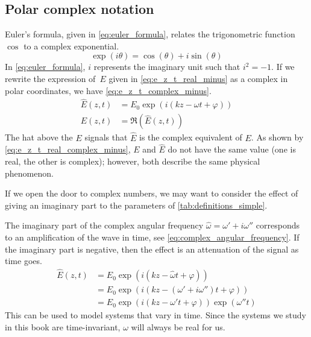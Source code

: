 \subsection{Polar complex notation}
\label{sec:polar_complex_notation}
Euler's formula, given in \cref{eq:euler_formula}, relates the trigonometric function $\cos$ to a complex exponential.
\begin{equation}    
    \exp(i\theta) = \cos(\theta) + i\sin(\theta) \label{eq:euler_formula}
\end{equation}
In \cref{eq:euler_formula}, $i$ represents the imaginary unit such that $i^2=-1$.
If we rewrite the expression of~$E$ given in \cref{eq:e_z_t_real_minus} as a complex in polar coordinates, we have \cref{eq:e_z_t_complex_minus}.
\begin{align}
   \hat{E}(z, t) &= E_0 \exp(i(kz - \omega t + \varphi))
   \label{eq:e_z_t_complex_minus}
   \\
   E(z, t) &= \Re(\hat{E}(z, t))
   \label{eq:e_z_t_real_complex_minus}
\end{align}
The hat above the $E$ signals that $\hat{E}$ is the complex equivalent of $E$.
As shown by \cref{eq:e_z_t_real_complex_minus}, $E$ and $\hat{E}$ do not have the same value (one is real, the other is complex);
however, both describe the same physical phenomenon.

If we open the door to complex numbers, we may want to consider the effect of giving an imaginary part to the parameters of \cref{tab:definitions_simple}.

The imaginary part of the complex angular frequency $\hat{\omega} = \omega' + i \omega''$ corresponds to an amplification of the wave in time, see \cref{eq:complex_angular_frequency}.
If the imaginary part is negative, then the effect is an attenuation of the signal as time goes.
\begin{subequations}
    \begin{align}
       \hat{E}(z, t) &=
       E_0 \exp(i(kz - \hat{\omega} t + \varphi))
       \\
       &=
       E_0 \exp(i(kz - (\omega' + i \omega'') t + \varphi))
       \\
       &=
       E_0 \exp(i(kz - \omega' t + \varphi)) \exp(\omega'' t)
    \end{align}
    \label{eq:complex_angular_frequency}
\end{subequations}
This can be used to model systems that vary in time.
Since the systems we study in this book are time-invariant, $\omega$ will always be real for us.

